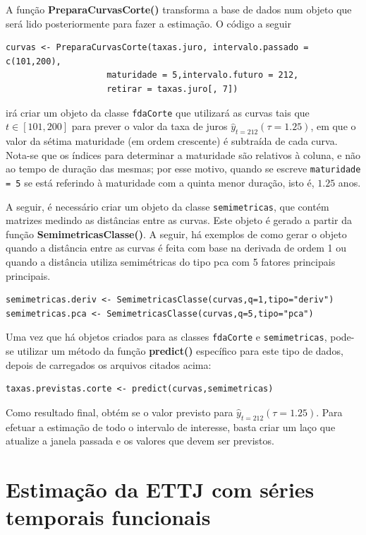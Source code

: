 \documentclass[
	12pt,				%
	openright,			%
	oneside,			%
	a4paper,			%
	english,			%
	brazil				%
	]{dissertacao-ufrgs-abntex2}
\begin{document}
\begin{apendicesenv}
A função \textbf{PreparaCurvasCorte()} transforma a base de dados num objeto que será lido posteriormente para fazer a estimação. O código a seguir
\begin{lstlisting}
curvas <- PreparaCurvasCorte(taxas.juro, intervalo.passado = c(101,200),
				    maturidade = 5,intervalo.futuro = 212, 
				    retirar = taxas.juro[, 7])
\end{lstlisting}
irá criar um objeto da classe \texttt{fdaCorte} que utilizará as curvas tais que $t \in [101,200]$ para prever o valor da taxa de juros $\hat{y}_{t=212}(\tau = 1.25)$, em que o valor da sétima maturidade (em ordem crescente) é subtraída de cada curva. Nota-se que os índices para determinar a maturidade são relativos à coluna, e não ao tempo de duração das mesmas; por esse motivo, quando se escreve \texttt{maturidade = 5} se está referindo à maturidade com a quinta menor duração, isto é, $1.25$ anos.

A seguir, é necessário criar um objeto da classe \texttt{semimetricas}, que contém matrizes medindo as distâncias entre as curvas. Este objeto é gerado a partir da função \textbf{SemimetricasClasse()}. A seguir, há exemplos de como gerar o objeto quando a distância entre as curvas é feita com base na derivada de ordem 1 ou quando a distância utiliza semimétricas do tipo pca com 5 fatores principais principais.
\begin{lstlisting} 
semimetricas.deriv <- SemimetricasClasse(curvas,q=1,tipo="deriv")
semimetricas.pca <- SemimetricasClasse(curvas,q=5,tipo="pca")
\end{lstlisting}
Uma vez que há objetos criados para as classes \texttt{fdaCorte} e \texttt{semimetricas}, pode-se utilizar um método da função \textbf{predict()} específico para este tipo de dados, depois de carregados os arquivos citados acima:
\begin{lstlisting}
taxas.previstas.corte <- predict(curvas,semimetricas)
\end{lstlisting}
Como resultado final, obtém se o valor previsto para $\hat{y}_{t=212}(\tau = 1.25)$. Para efetuar a estimação de todo o intervalo de interesse, basta criar um laço que atualize a janela passada e os valores que devem ser previstos.

\section{Estimação da ETTJ com séries temporais funcionais}


\end{apendicesenv}
\end{document}
